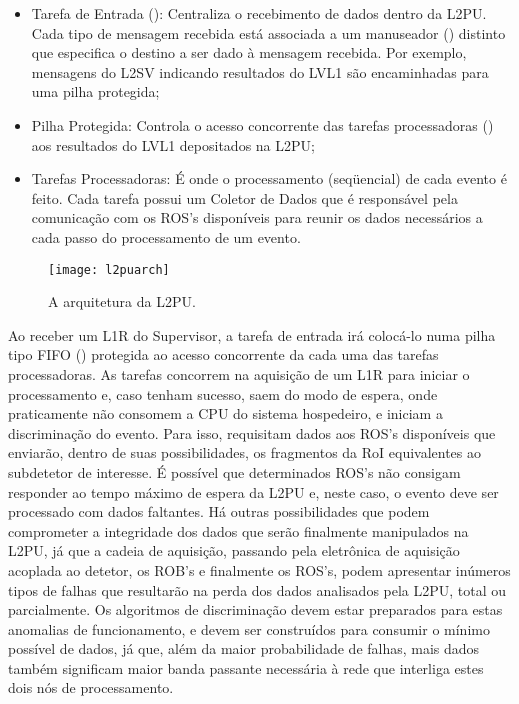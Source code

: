 \begin{itemize}
\item Tarefa de Entrada (): Centraliza o recebimento de dados
dentro da L2PU. Cada tipo de mensagem recebida está associada a um manuseador
() distinto que especifica o destino a ser dado à mensagem
recebida. Por exemplo, mensagens do L2SV indicando resultados do LVL1 são
encaminhadas para uma pilha protegida;

\item Pilha Protegida: Controla o acesso concorrente das tarefas processadoras
() aos resultados do LVL1 depositados na L2PU;

\item Tarefas Processadoras: É onde o processamento (seqüencial) de cada
evento é feito. Cada tarefa possui um Coletor de Dados que é responsável pela
comunicação com os ROS's disponíveis para reunir os dados necessários a cada
passo do processamento de um evento.
\end{itemize}

\begin{figure}
\begin{center}
\texttt{[image: l2puarch]}
\end{center}
\caption{A arquitetura da L2PU.}
\label{fig:l2puarch}
\end{figure}

Ao receber um L1R do Supervisor, a tarefa de entrada irá colocá-lo numa pilha
tipo FIFO () protegida ao acesso concorrente da cada
uma das tarefas processadoras. As tarefas concorrem na aquisição de um L1R
para iniciar o processamento e, caso tenham sucesso, saem do modo de espera,
onde praticamente não consomem a CPU do sistema hospedeiro, e iniciam a
discriminação do evento. Para isso, requisitam dados aos ROS's disponíveis que
enviarão, dentro de suas possibilidades, os fragmentos da RoI equivalentes ao
subdetetor de interesse. É possível que determinados ROS's não consigam
responder ao tempo máximo de espera da L2PU e, neste caso, o evento deve ser
processado com dados faltantes. Há outras possibilidades que podem comprometer
a integridade dos dados que serão finalmente manipulados na L2PU, já que a
cadeia de aquisição, passando pela eletrônica de aquisição acoplada ao
detetor, os ROB's e finalmente os ROS's, podem apresentar inúmeros tipos de
falhas que resultarão na perda dos dados analisados pela L2PU, total ou
parcialmente. Os algoritmos de discriminação devem estar preparados para estas
anomalias de funcionamento, e devem ser construídos para consumir o mínimo
possível de dados, já que, além da maior probabilidade de falhas, mais dados
também significam maior banda passante necessária à rede que interliga estes
dois nós de processamento.

